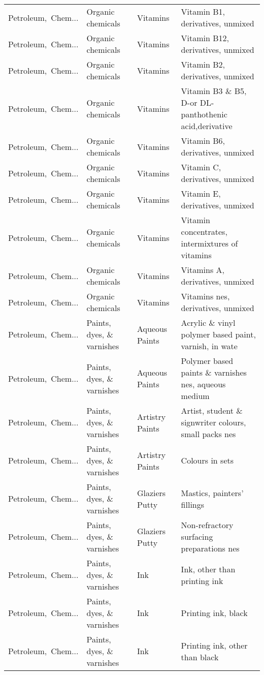\begin{appendices}
\begin{xltabular}{\textwidth}{|p{0.10\textwidth}|p{0.25\textwidth}|p{0.24\textwidth}|p{0.31\textwidth}|}
Petroleum,\ Chem... & Organic chemicals & Vitamins & Vitamin B1, derivatives, unmixed \\
Petroleum,\ Chem... & Organic chemicals & Vitamins & Vitamin B12, derivatives, unmixed \\
Petroleum,\ Chem... & Organic chemicals & Vitamins & Vitamin B2, derivatives, unmixed \\
Petroleum,\ Chem... & Organic chemicals & Vitamins & Vitamin B3 \& B5, D-or DL-panthothenic acid,derivative \\
Petroleum,\ Chem... & Organic chemicals & Vitamins & Vitamin B6, derivatives, unmixed \\
Petroleum,\ Chem... & Organic chemicals & Vitamins & Vitamin C, derivatives, unmixed \\
Petroleum,\ Chem... & Organic chemicals & Vitamins & Vitamin E, derivatives, unmixed \\
Petroleum,\ Chem... & Organic chemicals & Vitamins & Vitamin concentrates, intermixtures of vitamins \\
Petroleum,\ Chem... & Organic chemicals & Vitamins & Vitamins A, derivatives, unmixed \\
Petroleum,\ Chem... & Organic chemicals & Vitamins & Vitamins nes, derivatives, unmixed \\
Petroleum,\ Chem... & Paints, dyes, \& varnishes & Aqueous Paints & Acrylic \& vinyl polymer based paint, varnish, in wate \\
Petroleum,\ Chem... & Paints, dyes, \& varnishes & Aqueous Paints & Polymer based paints \& varnishes nes, aqueous medium \\
Petroleum,\ Chem... & Paints, dyes, \& varnishes & Artistry Paints & Artist, student \& signwriter colours, small packs nes \\
Petroleum,\ Chem... & Paints, dyes, \& varnishes & Artistry Paints & Colours in sets \\
Petroleum,\ Chem... & Paints, dyes, \& varnishes & Glaziers Putty & Mastics, painters' fillings \\
Petroleum,\ Chem... & Paints, dyes, \& varnishes & Glaziers Putty & Non-refractory surfacing preparations nes \\
Petroleum,\ Chem... & Paints, dyes, \& varnishes & Ink & Ink, other than printing ink \\
Petroleum,\ Chem... & Paints, dyes, \& varnishes & Ink & Printing ink, black \\
Petroleum,\ Chem... & Paints, dyes, \& varnishes & Ink & Printing ink, other than black \\

\end{xltabular}
\end{appendices}
